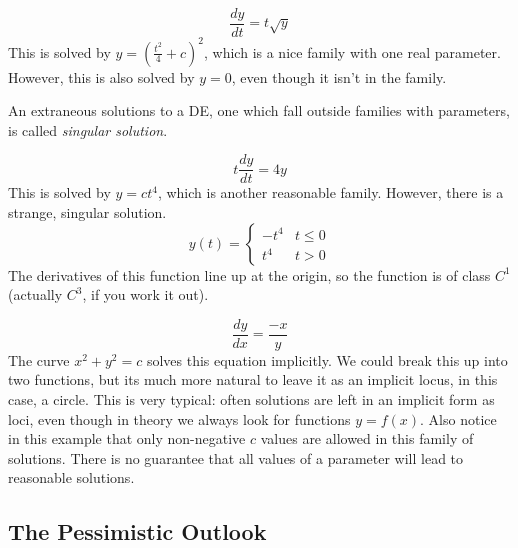 \documentclass[fleqn,letterpaper]{report}
\begin{document}
\begin{example}
\begin{equation*}
\frac{dy}{dt} = t \sqrt{y}
\end{equation*}
This is solved by $y = (\frac{t^2}{4} + c)^2$, which is a nice
family with one real parameter. However, this is also solved
by $y=0$, even though it isn't in the family. 
\end{example}

\begin{defn}
An extraneous solutions to a DE, one which fall outside
families with parameters, is called \emph{singular solution}.
\end{defn}

\begin{example}
\begin{equation*}
t \frac{dy}{dt} = 4y 
\end{equation*}
This is solved by $y = ct^4$, which is another reasonable
family. However, there is a strange, singular solution.
\begin{equation*}
y(t) = \left\{ \begin{matrix} -t^4 & t \leq 0 \\ t^4 & t>0
\end{matrix} \right.
\end{equation*}
The derivatives of this function line up at the origin, so the
function is of class $C^1$ (actually $C^3$, if you work it
out).  
\end{example}

\begin{example}
\begin{equation*}
\frac{dy}{dx} = \frac{-x}{y} 
\end{equation*}
The curve $x^2 + y^2 = c$ solves this equation implicitly.
We could break this up into two functions, but its much more
natural to leave it as an implicit locus, in this case, a
circle. This is very typical: often solutions are left in an
implicit form as loci, even though in theory we
always look for functions $y = f(x)$. Also notice in this
example that only non-negative $c$ values are allowed
in this family of solutions. There is no guarantee that all
values of a parameter will lead to reasonable solutions.
\end{example}

\subsection{The Pessimistic Outlook}
\label{pessimism}
\end{document}
